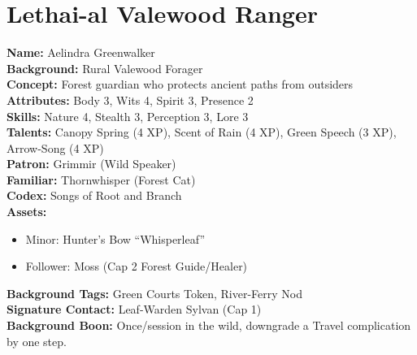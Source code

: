 \documentclass[11pt]{article}
\begin{document}
\section{Lethai-al Valewood Ranger}
\textbf{Name:} Aelindra Greenwalker \\
\textbf{Background:} Rural Valewood Forager \\
\textbf{Concept:} Forest guardian who protects ancient paths from outsiders \\
\textbf{Attributes:} Body 3, Wits 4, Spirit 3, Presence 2 \\
\textbf{Skills:} Nature 4, Stealth 3, Perception 3, Lore 3 \\
\textbf{Talents:} Canopy Spring (4 XP), Scent of Rain (4 XP), Green Speech (3 XP), Arrow-Song (4 XP) \\
\textbf{Patron:} Grimmir (Wild Speaker) \\
\textbf{Familiar:} Thornwhisper (Forest Cat) \\
\textbf{Codex:} Songs of Root and Branch \\
\textbf{Assets:}
\begin{itemize}
    \item Minor: Hunter's Bow ``Whisperleaf''
    \item Follower: Moss (Cap 2 Forest Guide/Healer)
\end{itemize}
\textbf{Background Tags:} Green Courts Token, River-Ferry Nod \\
\textbf{Signature Contact:} Leaf-Warden Sylvan (Cap 1) \\
\textbf{Background Boon:} Once/session in the wild, downgrade a Travel complication by one step.
\end{document}
